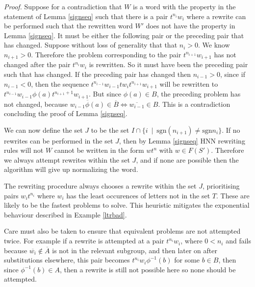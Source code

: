 \documentclass[12pt]{article} %
\theoremstyle{definition}
\theoremstyle{definition}
\theoremstyle{definition}
\newtheorem{lemma}[thm]{Lemma}
\theoremstyle{definition}
\begin{document}
\textit{Proof.}
Suppose for a contradiction that
$W$ is a word with the property in the statement of Lemma \ref{signseq}
such that there is a pair $t^{n_i}w_i$ where a rewrite can be performed such that
the rewritten word $W'$ does not have the property in Lemma \ref{signseq}.
It must be either the following pair or the preceding pair that has changed.
Suppose without loss of generality that that $n_i > 0$. We know $n_{i+1} > 0$.
Therefore the problem corresponding to the pair $t^{n_{i+1}}w_{i+1}$ has not changed
after the pair $t^{n_i}w_i$ is rewritten. So it must have been the preceding pair
such that has changed. If the preceding pair has changed then $n_{i - 1} > 0$, since if
$n_{i-1} < 0$, then the sequence $t^{n_{i-1}}w_{i - 1} t w_i t^{n_{i+1}} w_{i+1}$
will be rewritten to $t^{n_{i-1}}w_{i-1} \phi(a) t^{n_{i + 1} + 1}w_{i+1}$.
But since $\phi(a) \in B$, the preceding problem has not changed, because
$\overline{w_{i-1} \phi(a)} \in \overline{B} \iff \overline{w_{i-1}} \in B$.
This is a contradiction concluding the proof of Lemma \ref{signseq}.

We can now define the set $J$ to be the set
$I \cap \{i \ \mid \ \text{sgn}(n_{i+1}) \ne \text{sgn}{n_i} \}$. If no rewrites
can be performed in the set $J$, then by Lemma \ref{signseq} HNN rewriting rules
will not $W$ cannot be written in the form
$w t^n$ with $w \in F(S')$. Therefore we always attempt rewrites within the set $J$,
and if none are possible then the algorithm will give up normalizing the word.

The rewriting procedure always chooses a rewrite within the set $J$, prioritising
pairs $w_it^{n_i}$ where $w_i$ has the least occurences of letters not in
the set $T$. These are likely to be the fastest problems to solve.
This heuristic mitigates the exponential behaviour described in Example \ref{ltrbad}.

Care must also be taken to ensure that equivalent problems are not attempted twice.
For example if a rewrite is attempted at a pair $t^{n_i}w_i$, where $0 < n_i$
and fails because $\overline{w_i} \notin \overline{A}$ is not in the relevant subgroup,
and then later on after substitutions elsewhere, this pair becomes
$t^{n_i}w_i\phi^{-1}(b)$ for some $b \in B$, then since $\phi^{-1}(b) \in A$, then a rewrite
is still not possible here so none should be attempted.



\end{document}
